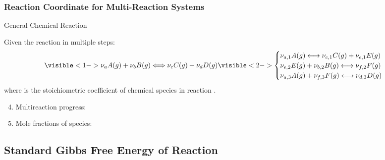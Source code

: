 \documentclass[10pt,compress,handout,unknownkeysallowed]{beamer}
\begin{document}
\begin{frame}
  \frametitle{Reaction Coordinate for Multi-Reaction Systems}
  \begin{block}{\begin{center}General Chemical Reaction\end{center}}
        Given the reaction in multiple steps:
        \begin{displaymath}
           \visible<1->{\nu_{a}A(g) + \nu_{b}B(g) \Longleftrightarrow \nu_{c}C(g) + \nu_{d}D(g)}\visible<2->{ \begin{cases}
               \nu_{a,1}A(g) \longleftrightarrow \nu_{c,1}C(g) + \nu_{e,1}E(g) & \\
               \nu_{e,2}E(g) + \nu_{b,2}B(g) \longleftrightarrow \nu_{f,2}F(g) & \\
               \nu_{a,3}A(g) + \nu_{f,3}F(g) \longleftrightarrow \nu_{d,3}D(g) & 
           \end{cases}}
         \end{displaymath} 
         where  is the stoichiometric coefficient of chemical species  in reaction .
  \end{block}
        \begin{enumerate} \setcounter{enumi}{3}
           \item<3-> Multireaction progress:
           \item<4-> Mole fractions of species:     
        \end{enumerate}
\end{frame}
\normalsize


\subsection{Standard Gibbs Free Energy of Reaction}
\end{document}
